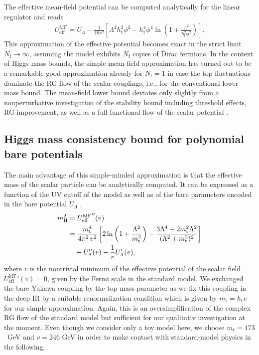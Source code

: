 \documentclass[twocolumn,aps,prd,showpacs,nofootinbib,superscriptaddress,preprintnumbers,floatfix,10pt]{revtex4-1}
\newcommand{\Nf}{N_{\mathrm{f}}}
\newcommand{\UL}{U_{\Lambda}}
\newcommand{\mH}{m_{\text{H}}}
\newcommand{\mtop}{m_{\text{t}}}
\newcommand{\htop}{h_{\mathrm{t}}}
\newcommand{\UMF}{U^{\mathrm{MF}}_{\mathrm{eff}}}
\begin{document}
The effective mean-field potential can be computed analytically for the linear regulator and reads
% 
\begin{align}
 \UMF = U_{\Lambda} - \frac{1}{16\pi^{2}} \left[ \Lambda^{2} \htop^{2} \phi^{2} - \htop^{4}\phi^{4} \ln\left( 1 + \frac{\Lambda^{2}}{\htop^{2}\phi^{2}} \right) \right]. 
\end{align}
%
This approximation of the effective potential becomes exact in the strict limit $\Nf \to \infty$, assuming the model exhibits $\Nf$ copies of Dirac fermions. In the context of Higgs mass bounds, the simple mean-field approximation has turned out to be a remarkable good approximation already for $\Nf=1$ in case the top fluctuations dominate the RG flow of the scalar couplings, i.e., for the conventional lower mass bound. The mean-field lower bound deviates only slightly from a nonperturbative investigation of the stability bound including threshold effects, RG improvement, as well as a full functional flow of the scalar potential \cite{Gies:2013fua,Borchardt:2016xju}.









\subsection{Higgs mass consistency bound for polynomial bare potentials}
The main advantage of this simple-minded approximation is that the effective mass of the scalar particle can be analytically computed. It can be expressed as a function of the UV cutoff of the model as well as of the bare parameters encoded in the bare potential $\UL$ \cite{Gies:2013fua},
%
\begin{align}
 \mH^{2} &= {\UMF}''(v) \notag \\
 &= \frac{\mtop^{4}}{4\pi^{2}\, v^{2}} \left[ 2 \ln\left( 1+ \frac{\Lambda^{2}}{\mtop^{2}} \right) - \frac{3\Lambda^{4} + 2\mtop^{2}\Lambda^{2}}{(\Lambda^{2} + \mtop^{2})^2} \right] \notag \\
 &\quad+ \UL''(v) - \frac{1}{v}\UL'(v),
 \label{eq:HiggsMassMF}
\end{align}
%
where $v$ is the nontrivial minimum of the effective potential of the scalar field ${\UMF}'(v) = 0$, given by the Fermi scale in the standard model. We exchanged the bare Yukawa coupling by the top mass parameter as we fix this coupling in the deep IR by a suitable renormalization condition which is given by $\mtop = \htop v$ for our simple approximation. 
Again, this is an oversimplification of the complex RG flow of the standard model but sufficient for our qualitativ investigation at the moment.
Even though we consider only a toy model here, we choose $\mtop = 173$~GeV and $v = 246$ GeV in order to make contact with standard-model physics in the following.
\end{document}
